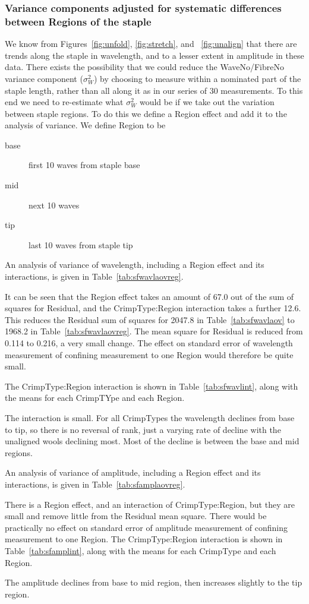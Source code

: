 \documentclass[titlepage,10pt]{article}  %
\begin{document}
\subsubsection{Variance components adjusted for systematic differences between Regions of the staple}
We know from Figures~\ref{fig:unfold}, \ref{fig:stretch}, and ~\ref{fig:unalign} that there are trends along the staple in wavelength, and to a lesser extent in amplitude in these data. There exists the possibility that we could reduce the WaveNo/FibreNo variance component ($\sigma^{2}_{W}$) by choosing to measure within a nominated part of the staple length, rather than all along it as in our series of 30 measurements.
 To this end we need to re-estimate what $\sigma^{2}_{W}$ would be if we take out the variation between staple regions. To do this we define a Region effect and add it to the analysis of variance. We define Region to be
\begin{description}
\item[base] first 10 waves from staple base
\item[mid] next 10 waves
\item[tip] last 10 waves from staple tip
\end{description}

An analysis of variance of wavelength, including a Region effect and its interactions, is given in Table~\ref{tab:sfwavlaovreg}.

It can be seen that the Region effect takes an amount of 67.0 out of the sum of squares for Residual, and the CrimpType:Region interaction takes a further 12.6. This reduces the Residual sum of squares for 2047.8 in Table~\ref{tab:sfwavlaov} to 1968.2 in Table~\ref{tab:sfwavlaovreg}. The mean square for Residual is reduced from 0.114 to 0.216, a very small change. The effect on standard error of wavelength measurement of confining measurement to one Region would therefore be quite small.

The CrimpType:Region interaction is shown in Table~\ref{tab:sfwavlint}, along with the means for each CrimpTYpe and each Region.

The interaction is small. For all CrimpTypes the wavelength declines from base to tip, so there is no reversal of rank, just a varying rate of decline with the unaligned wools declining most. Most of the decline is between the base and mid regions. 

An analysis of variance of amplitude, including a Region effect and its interactions, is given in Table~\ref{tab:sfamplaovreg}.

There is a Region effect, and an interaction of CrimpType:Region, but they are small and remove little from the Residual mean square. There would be practically no effect on standard error of amplitude measurement of confining measurement to one Region.
The CrimpType:Region interaction is shown in Table~\ref{tab:sfamplint}, along with the means for each CrimpType and each Region.

The amplitude declines from base to mid region, then increases slightly to the tip region.
\end{document}
